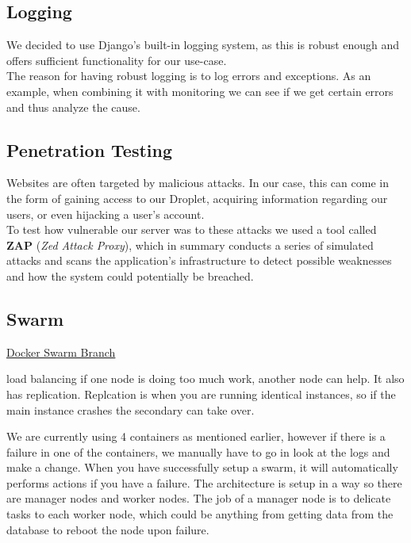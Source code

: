 \subsection*{Logging}

We decided to use Django's built-in logging system, as this is robust enough and offers sufficient functionality for our use-case.\\
The reason for having robust logging is to log errors and exceptions. As an example, when combining it with monitoring we can see if we get certain errors and thus analyze the cause.

\subsection*{Penetration Testing}

Websites are often targeted by malicious attacks. In our case, this can come in the form of gaining access to our Droplet, acquiring information regarding our users, or even hijacking a user's account.
\\
To test how vulnerable our server was to these attacks we used a tool called \textbf{ZAP} (\textit{Zed Attack Proxy}), which in summary conducts a series of simulated attacks and scans the application's infrastructure to detect possible weaknesses and how the system could potentially be breached.

\subsection*{Swarm}
\href{https://github.com/FiveGuys-DevOps/MiniTwit/tree/feature/terraform}{Docker Swarm Branch}



load balancing if one node is doing too much work, another node can help.
It also has replication. Replcation is when you are running identical instances, so if the main instance crashes the secondary can take over.


We are currently using 4 containers as mentioned earlier, however if there is a failure in one of the containers, we manually have to go in look at the logs and make a change. When you have successfully setup a swarm, it will automatically performs actions if you have a failure. The architecture is setup in a way so there are manager nodes and worker nodes. The job of a manager node is to delicate tasks to each worker node, which could be anything from getting data from the database to reboot the node upon failure.



